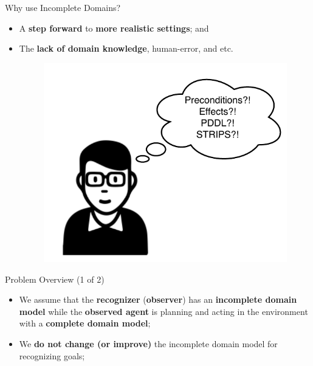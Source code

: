 \documentclass[usenames,dvipsnames]{beamer}
\begin{document}
    \begin{frame}{Why use Incomplete Domains?}
       	\begin{itemize}
			\item A \textbf{step forward} to \textbf{more realistic settings}; and
			
       		\item The \textbf{lack of domain knowledge}, human-error, and etc.
			\begin{figure}[]
			 	\centering
			 	\includegraphics[width=0.8\linewidth]{fig/nerd-incomplete_domain.pdf}
			\end{figure}
		\end{itemize}
    \end{frame}

    \begin{frame}{Problem Overview (1 of 2)}
       	\begin{itemize}
       		\item We assume that the \textbf{recognizer} (\textbf{observer}) has an \textbf{incomplete domain model} while the \textbf{observed agent} is planning and acting in the environment with a \textbf{complete domain model};
			\vspace{2mm}
			\item We \textbf{do not change (or improve)} the incomplete domain model for recognizing goals;
		\end{itemize}
    \end{frame}
	
	
\end{document}
